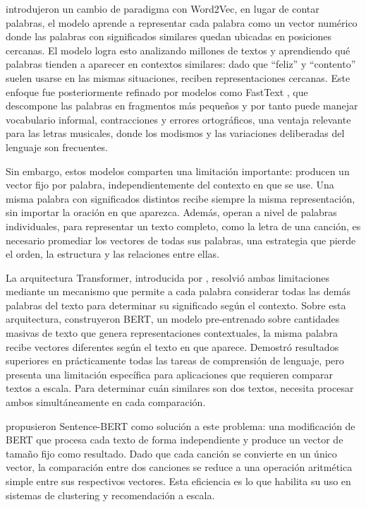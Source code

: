 \textcite{mikolov_2013_word2vec} introdujeron un cambio de paradigma con Word2Vec, en lugar de contar palabras, el modelo aprende a representar cada palabra como un vector numérico donde las palabras con significados similares quedan ubicadas en posiciones cercanas. El modelo logra esto analizando millones de textos y aprendiendo qué palabras tienden a aparecer en contextos similares: dado que ``feliz'' y ``contento'' suelen usarse en las mismas situaciones, reciben representaciones cercanas. Este enfoque fue posteriormente refinado por modelos como FastText \parencite{bojanowski_2017_fasttext}, que descompone las palabras en fragmentos más pequeños y por tanto puede manejar vocabulario informal, contracciones y errores ortográficos, una ventaja relevante para las letras musicales, donde los modismos y las variaciones deliberadas del lenguaje son frecuentes.

Sin embargo, estos modelos comparten una limitación importante: producen un vector fijo por palabra, independientemente del contexto en que se use. Una misma palabra con significados distintos recibe siempre la misma representación, sin importar la oración en que aparezca. Además, operan a nivel de palabras individuales, para representar un texto completo, como la letra de una canción, es necesario promediar los vectores de todas sus palabras, una estrategia que pierde el orden, la estructura y las relaciones entre ellas.

La arquitectura Transformer, introducida por \textcite{vaswani_2017_attention}, resolvió ambas limitaciones mediante un mecanismo que permite a cada palabra considerar todas las demás palabras del texto para determinar su significado según el contexto. Sobre esta arquitectura, \textcite{devlin_2019_bert} construyeron BERT, un modelo pre-entrenado sobre cantidades masivas de texto que genera representaciones contextuales, la misma palabra recibe vectores diferentes según el texto en que aparece. Demostró resultados superiores en prácticamente todas las tareas de comprensión de lenguaje, pero presenta una limitación específica para aplicaciones que requieren comparar textos a escala. Para determinar cuán similares son dos textos, necesita procesar ambos simultáneamente en cada comparación.

\textcite{reimers_2019_sentencebert} propusieron Sentence-BERT como solución a este problema: una modificación de BERT que procesa cada texto de forma independiente y produce un vector de tamaño fijo como resultado. Dado que cada canción se convierte en un único vector, la comparación entre dos canciones se reduce a una operación aritmética simple entre sus respectivos vectores. Esta eficiencia es lo que habilita su uso en sistemas de clustering y recomendación a escala.

